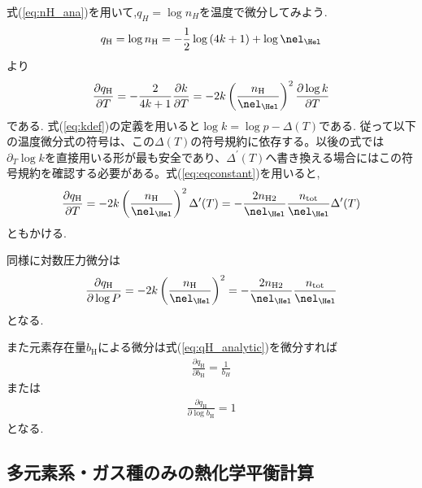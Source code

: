 式(\ref{eq:nH_ana})を用いて,$q_H = \log{n_H}$を温度で微分してみよう. 
\begin{align}
\label{eq:qH_analytic}
    q_\mathrm{H} = \log{n_\mathrm{H}} = - \frac{1}{2} \log{(4 k + 1)} + \log{\nel_\Hel}
\end{align}
より
\begin{align}
    \frac{\partial q_\mathrm{H}}{\partial T} =  - \frac{2}{4 k + 1} \frac{\partial k}{\partial T} = - 2 k \left( \frac{n_\mathrm{H}}{\nel_\Hel}\right)^2 \frac{\partial \log{k}}{\partial T}
\end{align}
である. 式(\ref{eq:kdef})の定義を用いると$\log{k} = \log{p} - \Delta (T) $である. 従って以下の温度微分式の符号は、この$\Delta(T)$の符号規約に依存する。以後の式では$\partial_T \log k$を直接用いる形が最も安全であり、$\Delta^\prime(T)$へ書き換える場合にはこの符号規約を確認する必要がある。式(\ref{eq:eqconstant})を用いると,
\begin{align}
\label{eq:diff_T}
    \frac{\partial q_\mathrm{H}}{\partial T} = - 2 k \left( \frac{n_\mathrm{H}}{\nel_\Hel}\right)^2 \Delta^\prime (T) 
     =  - \frac{2 n_\mathrm{H2}}{\nel_\Hel} \frac{n_\mathrm{tot} }{\nel_\Hel} \Delta^\prime (T) 
\end{align}
ともかける. 

同様に対数圧力微分は
\begin{align}
\label{eq:diff_lnp}
    \frac{\partial q_\mathrm{H}}{\partial \log{P}} = - 2 k \left( \frac{n_\mathrm{H}}{\nel_\Hel}\right)^2 
     =  - \frac{2 n_\mathrm{H2}}{\nel_\Hel} \frac{n_\mathrm{tot} }{\nel_\Hel} 
\end{align}
となる. 

また元素存在量$b_\mathrm{H}$による微分は式(\ref{eq:qH_analytic})を微分すれば
\begin{align}
\frac{\partial q_\mathrm{H}}{\partial b_\mathrm{H}} = \frac{1}{b_H} 
\end{align}
または
\begin{align}
\frac{\partial q_\mathrm{H}}{\partial \log{b_\mathrm{H}}} = 1 
\end{align}
となる. 

\subsection{多元素系・ガス種のみの熱化学平衡計算}

